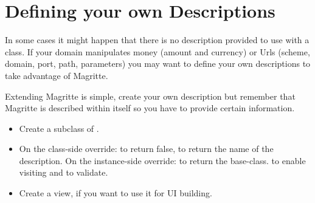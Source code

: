 \documentclass[a4paper,10pt,twoside]{book}
\begin{document}
% 
% 
% 
% 
% 
% 
% 
% 
\section{Defining your own Descriptions}
In some cases it might happen that there is no description provided to use with a  class.
If your domain manipulates money (amount and currency) or Urls (scheme, domain, port, path, parameters)
you may want to define your own descriptions to take advantage of Magritte. 
 
Extending Magritte is simple, create your own description but remember that Magritte is described within itself so you have to provide certain information.
 
\begin{itemize}
\item Create a subclass of .
\item On the class-side override:  to return false,  to return the name of the description. On the instance-side override:  to return the base-class.  to enable visiting and  to validate.
\item Create a view, if you want to use it for UI building. 
\end{itemize}
 
\end{document}
